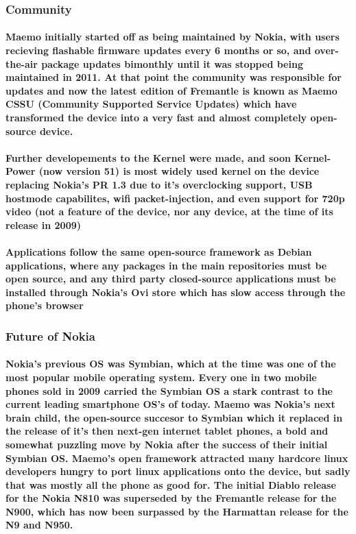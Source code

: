 \documentclass[11pt]{article} %
\begin{document}
\subsubsection{Community}
\paragraph{Maemo initially started off as being maintained by Nokia, with users recieving flashable firmware updates every 6 months or so, and over-the-air package updates bimonthly until it was stopped being maintained in 2011. At that point the community was responsible for updates and now the latest edition of Fremantle is known as Maemo CSSU (Community Supported Service Updates) which have transformed the device into a very fast and almost completely open-source device.}
\paragraph{Further developements to the Kernel were made, and soon Kernel-Power (now version 51)  is most widely used kernel on the device replacing Nokia's PR 1.3 due to it's overclocking support, USB hostmode capabilites, wifi packet-injection, and even support for 720p video (not a feature of the device, nor any device, at the time of its release in 2009)}
\paragraph{Applications follow the same open-source framework as Debian applications, where any packages in the main repositories must be open source, and any third party closed-source applications must be installed through Nokia's Ovi store which has slow access through the phone's browser}

\subsubsection{Future of Nokia}
\paragraph{Nokia's previous OS was Symbian, which at the time was one of the most popular mobile operating system. Every one in two mobile phones sold in 2009 carried the Symbian OS\cite{symb1} a stark contrast to the current leading smartphone OS's of today. Maemo was Nokia's next brain child, the open-source succesor to Symbian which it replaced in the release of  it's then next-gen internet tablet phones, a bold and somewhat puzzling move by Nokia after the success of their initial Symbian OS. Maemo's open framework attracted many hardcore linux developers hungry to port linux applications onto the device, but sadly that was mostly all the phone as good for. The initial Diablo release for the Nokia N810 was superseded by  the Fremantle release for the N900, which has now been surpassed by the Harmattan release for the N9 and N950.}
\end{document}
